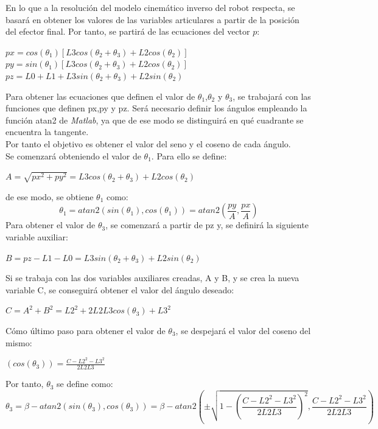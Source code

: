 	En lo que a la resolución del modelo cinemático inverso del robot respecta, se basará en obtener los valores de las variables articulares a partir de la posición del efector final. Por tanto, se partirá de las ecuaciones del vector $p$:

	\begin{center}
		$px=cos(\theta_{1})[L3cos(\theta_{2}+\theta_{3}) + L2cos(\theta_{2})]$ \\
		$py=sin(\theta_{1})[L3cos(\theta_{2}+\theta_{3}) + L2cos(\theta_{2})]$ \\
		$pz=L0 + L1 + L3sin(\theta_{2}+\theta_{3}) + L2sin(\theta_{2})$
	\end{center}

	Para obtener las ecuaciones que definen el valor de $\theta_{1}$,$\theta_{2}$ y $\theta_{3}$, se trabajará con las funciones que definen px,py y pz. Será necesario definir los ángulos empleando la función atan2 de \textit{Matlab}, ya que de ese modo se distinguirá en qué cuadrante se encuentra la tangente.\\
	Por tanto el objetivo es obtener el valor del seno y el coseno de cada ángulo.\\

	Se comenzará obteniendo el valor de $\theta_{1}$. Para ello se define:\\
	\begin{center}
		$ A = \sqrt{px^{2}+py^{2}} = L3cos(\theta_{2}+\theta_{3}) + L2cos(\theta_{2})$
	\end{center}
	de ese modo, se obtiene $\theta_{1}$ como:\\
	\begin{equation}
	\theta_{1}=atan2(sin(\theta_{1}),cos(\theta_{1}))=atan2(\frac{py}{A},\frac{px}{A})
	\end{equation}
	Para obtener el valor de $\theta_{3}$, se comenzará a partir de pz y, se definirá la siguiente variable auxiliar:\\
	\begin{center}
		$ B=pz-L1-L0=L3sin(\theta_{2}+\theta_{3}) + L2sin(\theta_{2})$
	\end{center}
	Si se trabaja con las dos variables auxiliares creadas, A y B, y se crea la nueva variable C, se conseguirá obtener el valor del ángulo deseado:\\
	\begin{center}
		$C= A^{2} + B^{2} = L2^{2}+ 2L2L3cos(\theta_{3}) + L3^{2} $
	\end{center}

	Cómo último paso para obtener el valor de $\theta_{3}$, se despejará el valor del coseno del mismo:\\
	\begin{center}
		$ (cos(\theta_{3})) = \frac{C-L2^{2}-L3^{2}}{2L2L3} $
	\end{center}
	Por tanto, $\theta_{3}$ se define como:\\
	\begin{equation}
	\theta_{3}=\beta -atan2(sin(\theta_{3}),cos(\theta_{3}))=\beta-atan2(\pm \sqrt{1-(\frac{C-L2^{2}-L3^{2}}{2L2L3})^{2}},\frac{C-L2^{2}-L3^{2}}{2L2L3} )
	\end{equation}

